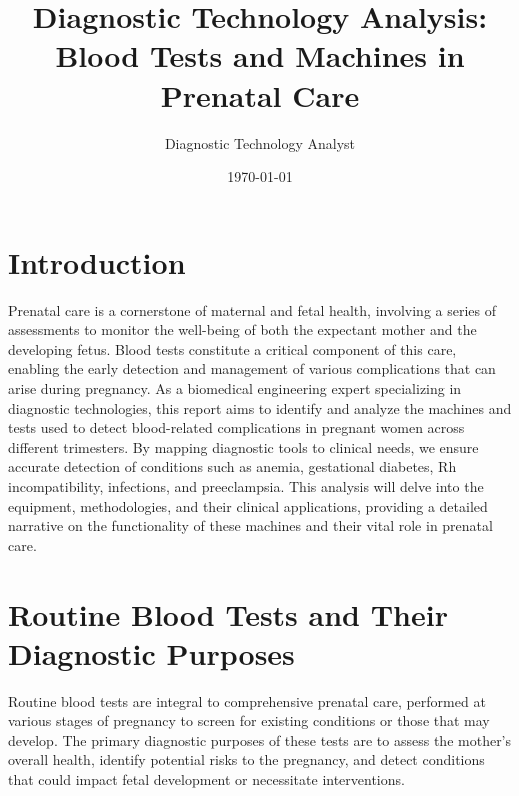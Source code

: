 \documentclass{article}
\title{Diagnostic Technology Analysis: Blood Tests and Machines in Prenatal Care}
\author{Diagnostic Technology Analyst}
\date{\today}
\begin{document}
\maketitle

\section{Introduction}
Prenatal care is a cornerstone of maternal and fetal health, involving a series of assessments to monitor the well-being of both the expectant mother and the developing fetus. Blood tests constitute a critical component of this care, enabling the early detection and management of various complications that can arise during pregnancy. As a biomedical engineering expert specializing in diagnostic technologies, this report aims to identify and analyze the machines and tests used to detect blood-related complications in pregnant women across different trimesters. By mapping diagnostic tools to clinical needs, we ensure accurate detection of conditions such as anemia, gestational diabetes, Rh incompatibility, infections, and preeclampsia. This analysis will delve into the equipment, methodologies, and their clinical applications, providing a detailed narrative on the functionality of these machines and their vital role in prenatal care.

\section{Routine Blood Tests and Their Diagnostic Purposes}
Routine blood tests are integral to comprehensive prenatal care, performed at various stages of pregnancy to screen for existing conditions or those that may develop. The primary diagnostic purposes of these tests are to assess the mother's overall health, identify potential risks to the pregnancy, and detect conditions that could impact fetal development or necessitate interventions.
\end{document}
